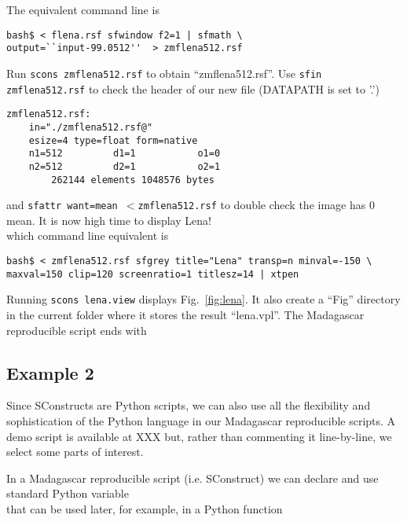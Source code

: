
%
The equivalent command line is
%
\begin{verbatim}
bash$ < flena.rsf sfwindow f2=1 | sfmath \ 
output=``input-99.0512''  > zmflena512.rsf
\end{verbatim}
%
Run \texttt{scons zmflena512.rsf} to obtain ``zmflena512.rsf''. Use
\texttt{sfin zmflena512.rsf} to check the header of our new file
(DATAPATH is set to '.')
%
\begin{verbatim}
zmflena512.rsf:
    in="./zmflena512.rsf@"
    esize=4 type=float form=native 
    n1=512         d1=1           o1=0          
    n2=512         d2=1           o2=1          
        262144 elements 1048576 bytes
\end{verbatim}
%
and \texttt{sfattr want=mean $<$zmflena512.rsf} to double check the
image has 0 mean. It is now high time to display Lena!\\
%

%
which command line equivalent is
\begin{verbatim}
bash$ < zmflena512.rsf sfgrey title="Lena" transp=n minval=-150 \
maxval=150 clip=120 screenratio=1 titlesz=14 | xtpen
\end{verbatim}
%
Running \texttt{scons lena.view} displays Fig.~\ref{fig:lena}.
%
\inputdir{easystart}
%
It also create a ``Fig'' directory in the current folder where it
stores the result ``lena.vpl''. The Madagascar reproducible script
ends with\\
%


\subsection{Example 2}

Since SConstructs are Python scripts, we can also use all the
flexibility and sophistication of the Python language in our
Madagascar reproducible scripts. A demo script is available at XXX
but, rather than commenting it line-by-line, we select some parts of
interest.

In a Madagascar reproducible script (i.e. SConstruct) we can declare
and use standard Python variable\\



\noindent that can be used later, for example, in a Python function\\

